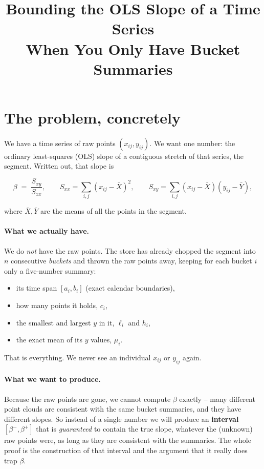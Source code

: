 \documentclass[11pt]{article}
\title{Bounding the OLS Slope of a Time Series\\
       When You Only Have Bucket Summaries}
\author{}
\date{}
\begin{document}
\maketitle

\section{The problem, concretely}

We have a time series of raw points $(x_{ij}, y_{ij})$. We want one
number: the ordinary least-squares (OLS) slope of a contiguous stretch
of that series, the segment. Written out, that slope is

\[
\beta \;=\; \frac{S_{xy}}{S_{xx}},
\qquad
S_{xx}=\sum_{i,j}(x_{ij}-\bar X)^2,
\qquad
S_{xy}=\sum_{i,j}(x_{ij}-\bar X)(y_{ij}-\bar Y),
\]

where $\bar X,\bar Y$ are the means of all the points in the segment.

\paragraph{What we actually have.}
We do \emph{not} have the raw points. The store has already chopped the
segment into $n$ consecutive \emph{buckets} and thrown the raw points
away, keeping for each bucket $i$ only a five-number summary:

\begin{itemize}[noitemsep]
  \item its time span $[a_i,b_i]$ (exact calendar boundaries),
  \item how many points it holds, $c_i$,
  \item the smallest and largest $y$ in it, $\ell_i$ and $h_i$,
  \item the exact mean of its $y$ values, $\mu_i$.
\end{itemize}

That is everything. We never see an individual $x_{ij}$ or $y_{ij}$
again.

\paragraph{What we want to produce.}
Because the raw points are gone, we cannot compute $\beta$ exactly --
many different point clouds are consistent with the same bucket
summaries, and they have different slopes. So instead of a single
number we will produce an \textbf{interval} $[\beta^-,\beta^+]$ that is
\emph{guaranteed} to contain the true slope, whatever the (unknown) raw
points were, as long as they are consistent with the summaries. The
whole proof is the construction of that interval and the argument that
it really does trap $\beta$.
\end{document}
